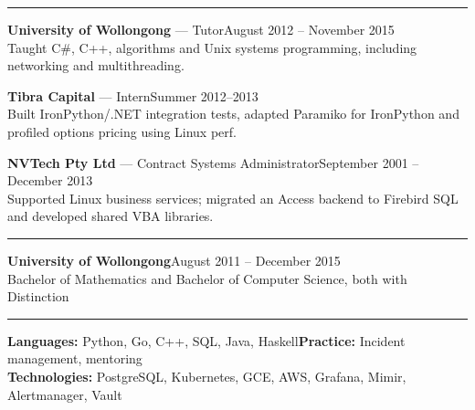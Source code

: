 \documentclass[a4paper,10pt]{article}
\newcommand{\resheading}[1]{\par\vspace{5pt}{\scshape #1}\par\vspace{1pt}\hrule\vspace{4pt}}
\begin{document}
\resheading{Earlier roles}
\textbf{University of Wollongong} --- Tutor\hfill August 2012 -- November 2015\\
Taught C\#, C++, algorithms and Unix systems programming, including networking and multithreading.\par\vspace{3pt}
\textbf{Tibra Capital} --- Intern\hfill Summer 2012--2013\\
Built IronPython/.NET integration tests, adapted Paramiko for IronPython and profiled options pricing using Linux perf.\par\vspace{3pt}
\textbf{NVTech Pty Ltd} --- Contract Systems Administrator\hfill September 2001 -- December 2013\\
Supported Linux business services; migrated an Access backend to Firebird SQL and developed shared VBA libraries.
\resheading{Education}
\textbf{University of Wollongong}\hfill August 2011 -- December 2015\\
Bachelor of Mathematics and Bachelor of Computer Science, both with Distinction

\resheading{Skills}
\textbf{Languages:} Python, Go, C++, SQL, Java, Haskell\quad\textbf{Practice:} Incident management, mentoring\\
\textbf{Technologies:} PostgreSQL, Kubernetes, GCE, AWS, Grafana, Mimir, Alertmanager, Vault
\end{document}
